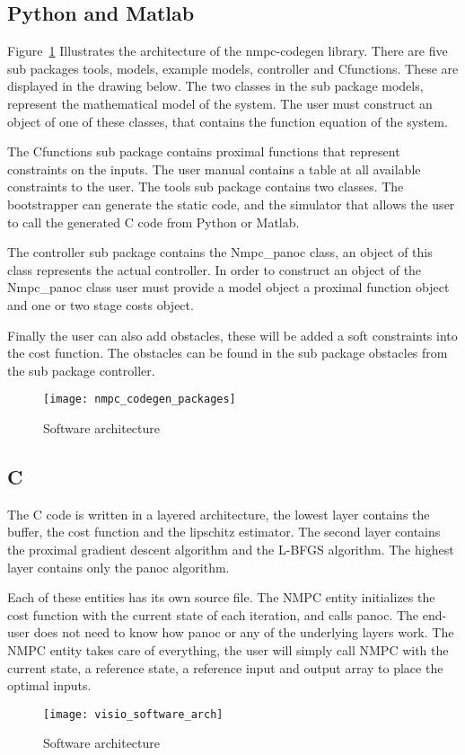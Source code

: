 \subsection{Python and Matlab}
Figure~\ref{fig:nmpc_codegen_packages} Illustrates the architecture of the nmpc-codegen library. There are five sub packages tools, models, example models, controller and Cfunctions. These are displayed in the drawing below. The two classes in the sub package models, represent the mathematical model of the system. The user must construct an object of one of these classes, that contains the function equation of the system.

The Cfunctions sub package contains proximal functions that represent constraints on the inputs. The user manual contains a table at all available constraints to the user. The tools sub package contains two classes. The bootstrapper can generate the static code, and the simulator that allows the user to call the generated C code from Python or Matlab.

The controller sub package contains the Nmpc\_panoc class, an object of this class represents the actual controller. In order to construct an object of the Nmpc\_panoc class user must provide a model object a proximal function object and one or two stage costs object.

Finally the user can also add obstacles, these will be added a soft constraints into the cost function. The obstacles can be found in the sub package obstacles from the sub package controller.
	\begin{figure}[H]
		\centering
		\texttt{[image: nmpc\_codegen\_packages]}
		\caption{Software architecture}
		\label{fig:nmpc_codegen_packages}
	\end{figure}

\subsection{C}
The C code is written in a layered architecture, the lowest layer contains the buffer, the cost function and the lipschitz estimator. The second layer contains the proximal gradient descent algorithm and the L-BFGS algorithm. The highest layer contains only the panoc algorithm.

Each of these entities has its own source file. The NMPC entity initializes the cost function with the current state of each iteration, and calls panoc. The end-user does not need to know how panoc or any of the underlying layers work. The NMPC entity takes care of everything, the user will simply call NMPC with the current state, a reference state, a reference input and output array to place the optimal inputs.
	\begin{figure}[H]
		\centering
		\texttt{[image: visio\_software\_arch]}
		\caption{Software architecture}
		\label{fig:visio software arch}
	\end{figure}
